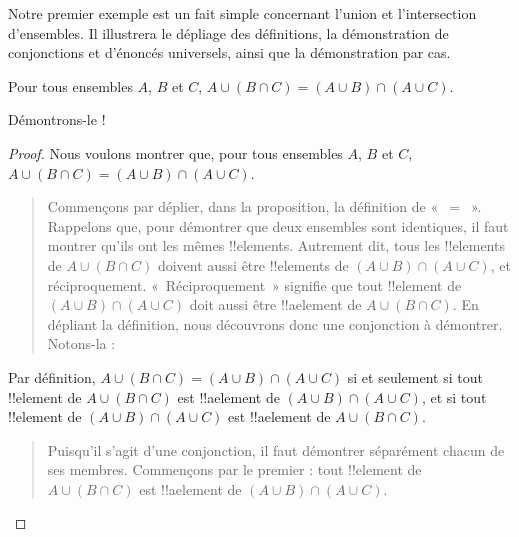 \documentclass[../../../include/open-logic-section]{subfiles}
\begin{document}


Notre premier exemple est un fait simple concernant
l'union et l'intersection d'ensembles. Il illustrera
le dépliage des définitions, la démonstration de
conjonctions et d'énoncés universels, ainsi que
la démonstration par cas.

\begin{prop}
Pour tous ensembles $A$, $B$ et $C$,
$A \cup (B \cap C) = (A \cup B) \cap (A \cup C)$.
\end{prop}

Démontrons-le !{}

\begin{proof}
Nous voulons montrer que, pour tous ensembles
$A$, $B$ et $C$,
$A \cup (B \cap C) = (A \cup B) \cap (A \cup C)$.
\begin{quote}
Commençons par déplier, dans la proposition,
la définition de «~$=$~». Rappelons que,
pour démontrer que deux ensembles sont
identiques, il faut montrer qu'ils ont
les mêmes !!{element}s. Autrement dit,
tous les !!{element}s de $A \cup (B \cap C)$
doivent aussi être !!{element}s de
$(A \cup B) \cap (A \cup C)$, et
réciproquement. «~Réciproquement~» signifie
que tout !!{element} de
$(A \cup B) \cap (A \cup C)$ doit aussi
être !!a{element} de $A \cup (B \cap C)$.
En dépliant la définition, nous découvrons
donc une conjonction à démontrer.
Notons-la :
\end{quote}
Par définition,
$A \cup (B \cap C) = (A \cup B) \cap (A \cup C)$
si et seulement si tout !!{element} de
$A \cup (B \cap C)$ est !!a{element} de
$(A \cup B) \cap (A \cup C)$, et si tout
!!{element} de $(A \cup B) \cap (A \cup C)$
est !!a{element} de $A \cup (B \cap C)$.
\begin{quote}
Puisqu'il s'agit d'une conjonction,
il faut démontrer séparément chacun
de ses membres. Commençons par le
premier : tout !!{element} de
$A \cup (B \cap C)$ est
!!a{element} de
$(A \cup B) \cap (A \cup C)$.


\end{quote}
\end{proof}
\end{document}

